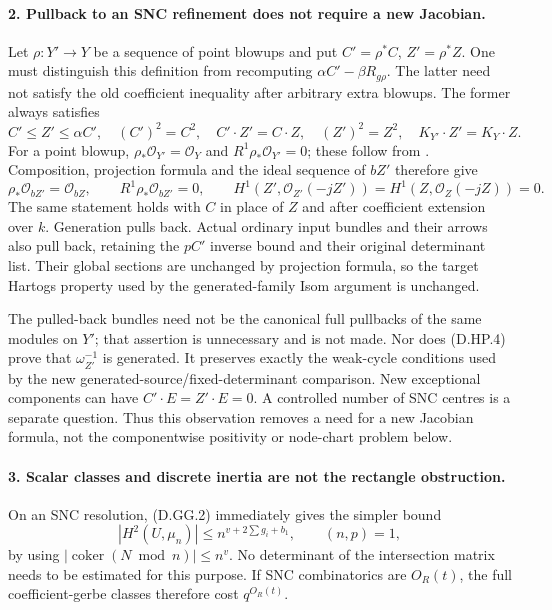 \paragraph{2. Pullback to an SNC refinement does not require a new Jacobian.}
Let $\rho:Y'\to Y$ be a sequence of point blowups and put
$C'=\rho^*C$, $Z'=\rho^*Z$. One must distinguish this definition
from recomputing $\alpha C'-\beta R_{g\rho}$. The latter need
not satisfy the old coefficient inequality after arbitrary
extra blowups. The former always satisfies
\[
 C'\le Z'\le\alpha C',\quad
 (C')^2=C^2,\quad C'\cdot Z'=C\cdot Z,\quad
 (Z')^2=Z^2,\quad K_{Y'}\cdot Z'=K_Y\cdot Z.              \tag{D.HP.3}
\]
For a point blowup, $\rho_*\mathcal O_{Y'}=\mathcal O_Y$
and $R^1\rho_*\mathcal O_{Y'}=0$; these follow from
\citet[Lemma 54.3.4(1),(2),(4), Tag 0AGS]{StacksHereditaryCostB}.
Composition, projection formula and the ideal sequence of
$bZ'$ therefore give
\[
 \rho_*\mathcal O_{bZ'}=\mathcal O_{bZ},\qquad
 R^1\rho_*\mathcal O_{bZ'}=0,\qquad
 H^1(Z',\mathcal O_{Z'}(-jZ'))
     =H^1(Z,\mathcal O_Z(-jZ))=0.                        \tag{D.HP.4}
\]
The same statement holds with $C$ in place of $Z$ and after
coefficient extension over $k$. Generation pulls back. Actual
ordinary input bundles and their arrows also pull back, retaining
the $pC'$ inverse bound and their original determinant list.
Their global sections are unchanged by projection formula, so
the target Hartogs property used by the generated-family Isom
argument is unchanged.

The pulled-back bundles need not be the canonical full pullbacks
of the same modules on $Y'$; that assertion is unnecessary and
is not made. Nor does (D.HP.4) prove that $\omega_{Z'}^{-1}$ is
generated. It preserves exactly the weak-cycle conditions used
by the new generated-source/fixed-determinant comparison.
New exceptional components can have
$C'\cdot E=Z'\cdot E=0$. A controlled number of SNC centres
is a separate question. Thus this observation removes a need
for a new Jacobian formula, not the componentwise positivity
or node-chart problem below.

\paragraph{3. Scalar classes and discrete inertia are not the rectangle obstruction.}
On an SNC resolution, (D.GG.2) immediately gives the simpler bound
\[
 |H^2(U,\mu_n)|\le n^{v+2\sum g_i+b_1},\qquad (n,p)=1,    \tag{D.HP.5}
\]
by using $|\operatorname{coker}(N\bmod n)|\le n^v$.
No determinant of the intersection matrix needs to be estimated
for this purpose. If SNC combinatorics are $O_R(t)$, the full
coefficient-gerbe classes therefore cost $q^{O_R(t)}$.


